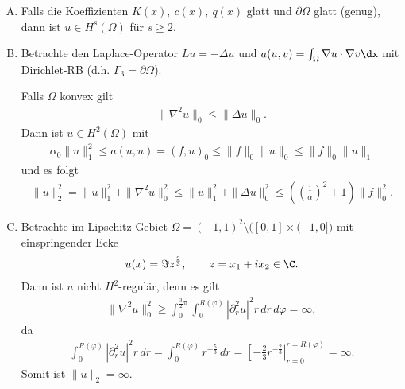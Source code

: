 \begin{Beispiel}
    \begin{enumerate}[A)]
        \item
          Falls die Koeffizienten $K(x), \ c(x) , \ q(x)$ glatt und
          $\partial\Omega$ glatt (genug), dann ist $u\in H^s(\Omega)$ für
          $s \ge 2$.
        \item
          Betrachte den Laplace-Operator $Lu = -\Delta u$ und
          $a(u, v) = \int_{\Omega} \nabla u \cdot \nabla v \dx$ mit
          Dirichlet-RB (d.h. $\Gamma_3 = \partial\Omega$).

          Falls $\Omega$ konvex gilt
          \begin{eqnarray*}
              \|\nabla^2 u\|_0 \le \|\Delta u\|_0.
          \end{eqnarray*}
          Dann ist $u\in H^2(\Omega)$ mit
          \begin{eqnarray*}
              \alpha_0 \|u\|_1^2 \le a(u, u) = (f, u)_0 \le \|f\|_0 \|u\|_0
              \le \|f\|_0 \|u\|_1
          \end{eqnarray*}
          und es folgt
          \begin{eqnarray*}
                \|u\|_2^2
              = \|u\|_1^2 + \|\nabla^2 u\|_0^2
              \le \|u\|_1^2 + \|\Delta u\|_0^2
              \le \left(\left(\frac{1}{\alpha}\right)^2 + 1\right) \|f\|_0^2.
          \end{eqnarray*}
        \item
          Betrachte im Lipschitz-Gebiet
          $\Omega = (-1, 1)^2 \setminus \big( [0, 1] \times (-1, 0] \big)$
          mit einspringender Ecke
          \begin{eqnarray*}
              u(x) = \Im z^\frac{2}{3}, \qquad z = x_1 + i x_2 \in \C.
          \end{eqnarray*}
          Dann ist $u$ nicht $H^2$-regulär, denn es gilt
          \begin{eqnarray*}
                  \|\nabla^2 u\|_0^2
              \ge \int_0^{\frac{3}{2}\pi} \int_0^{R(\varphi)}
                  \left|\partial_r^2 u\right|^2 r \,dr \,d\varphi = \infty,
          \end{eqnarray*}
          da
          \begin{eqnarray*}
                \int_0^{R(\varphi)} \left|\partial_r^2 u\right|^2 r \,dr
              = \int_0^{R(\varphi)} r^{-\frac{5}{3}} \,dr
              = \left[-\frac{2}{3} r^{-\frac{2}{3}}\right|_{r=0}^{r=R(\varphi)}
              = \infty.
          \end{eqnarray*}
          Somit ist $\|u\|_2 = \infty$.
    \end{enumerate}
\end{Beispiel}


